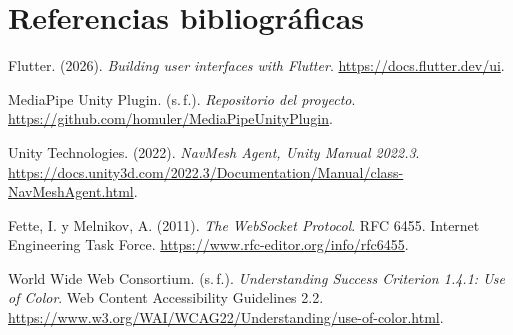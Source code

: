 \documentclass[11pt,a4paper]{article}
\begin{document}
\section{Referencias bibliográficas}

\begin{description}[leftmargin=1.2cm,labelwidth=1cm,labelsep=0.2cm,itemsep=0.6em]
  \item[{[R1]}] Flutter. (2026). \textit{Building user interfaces with Flutter}. \url{https://docs.flutter.dev/ui}.
  \item[{[R2]}] MediaPipe Unity Plugin. (s.\,f.). \textit{Repositorio del proyecto}. \url{https://github.com/homuler/MediaPipeUnityPlugin}.
  \item[{[R3]}] Unity Technologies. (2022). \textit{NavMesh Agent, Unity Manual 2022.3}. \url{https://docs.unity3d.com/2022.3/Documentation/Manual/class-NavMeshAgent.html}.
  \item[{[R4]}] Fette, I. y Melnikov, A. (2011). \textit{The WebSocket Protocol}. RFC 6455. Internet Engineering Task Force. \url{https://www.rfc-editor.org/info/rfc6455}.
  \item[{[R5]}] World Wide Web Consortium. (s.\,f.). \textit{Understanding Success Criterion 1.4.1: Use of Color}. Web Content Accessibility Guidelines 2.2. \url{https://www.w3.org/WAI/WCAG22/Understanding/use-of-color.html}.
\end{description}
\end{document}
